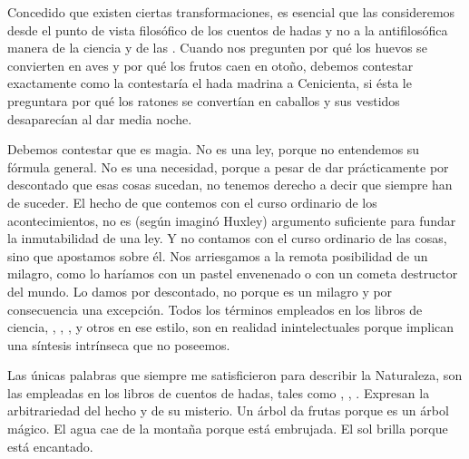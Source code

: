 Concedido que existen ciertas transformaciones, es esencial que las consideremos desde el punto de
vista filosófico de los cuentos de hadas y no a la antifilosófica manera de la ciencia y de las . Cuando nos pregunten por qué los huevos se convierten en aves y por qué los frutos caen en
otoño, debemos contestar exactamente como la contestaría el hada madrina a Cenicienta, si ésta le
preguntara por qué los ratones se convertían en caballos y sus vestidos desaparecían al dar media noche.

Debemos contestar que es magia. No es una ley, porque no entendemos su fórmula general. No es
una necesidad, porque a pesar de dar prácticamente por descontado que esas cosas sucedan, no tenemos
derecho a decir que siempre han de suceder. El hecho de que contemos con el curso ordinario de los
acontecimientos, no es (según imaginó Huxley) argumento suficiente para fundar la inmutabilidad de una
ley. Y no contamos con el curso ordinario de las cosas, sino que apostamos sobre él. Nos arriesgamos a la
remota posibilidad de un milagro, como lo haríamos con un pastel envenenado o con un cometa
destructor del mundo. Lo damos por descontado, no porque es un milagro y por consecuencia una
excepción. Todos los términos empleados en los libros de ciencia, , , ,
 y otros en ese estilo, son en realidad inintelectuales porque implican una síntesis intrínseca
que no poseemos.

Las únicas palabras que siempre me satisficieron para describir la Naturaleza, son las empleadas en
los libros de cuentos de hadas, tales como , , . Expresan la
arbitrariedad del hecho y de su misterio. Un árbol da frutas porque es un árbol mágico. El agua cae de la
montaña porque está embrujada.
El sol brilla porque está encantado.

